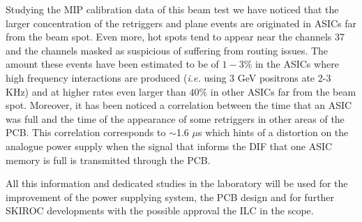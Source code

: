 \documentclass[a4paper,11pt]{article}
\begin{document}
Studying the MIP calibration data of this beam test we have noticed that the larger concentration of the retriggers and plane events are originated 
in
ASICs far from the beam spot. Even more, hot spots tend to appear near the channels 37 and the channels masked
as suspicious of suffering from routing issues. The amount these events have been estimated to be of $1-3\%$ in the ASICs where high frequency
interactions are produced ({\it i.e.} using 3 GeV positrons ate 2-3 KHz) and at higher rates even larger than $40\%$ in other 
ASICs far from the beam spot.
Moreover, it has been noticed a correlation between the time that an ASIC was full and the time of the appearance of some 
retriggers in other areas of the PCB. 
This correlation corresponds to $\sim$1.6 $\mu$s which hints
of a distortion on the analogue power supply when
the signal that informs the DIF that one ASIC memory is full is transmitted through the PCB.

All this information and dedicated studies in the laboratory will be used for the
improvement of the power supplying system, the PCB design and for further SKIROC developments 
with the possible approval the ILC in the scope.




\end{document}
